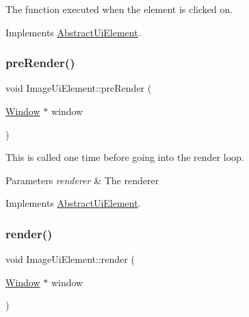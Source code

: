 The function executed when the element is clicked on. 



Implements \mbox{\hyperlink{class_abstract_ui_element_a42296c15c9e70b6ac7fda0b1862612af}{Abstract\+Ui\+Element}}.

\mbox{\label{class_image_ui_element_a15c523c82400b74f2f5713c6510f8c7a}} 
\subsubsection{\texorpdfstring{pre\+Render()}{preRender()}}
{\footnotesize\ttfamily void Image\+Ui\+Element\+::pre\+Render (\begin{DoxyParamCaption}\item[{\mbox{\hyperlink{class_window}{Window}} $\ast$}]{window }\end{DoxyParamCaption})\hspace{0.3cm}{\ttfamily [virtual]}}

This is called one time before going into the render loop. 


\begin{DoxyParams}{Parameters}
{\em renderer} & The renderer\\
\hline
\end{DoxyParams}


Implements \mbox{\hyperlink{class_abstract_ui_element_a859f627ab385e9d3bf6ce8db40607cdb}{Abstract\+Ui\+Element}}.

\mbox{\label{class_image_ui_element_af0928d725565618d6a9c8a2f557c1709}} 
\subsubsection{\texorpdfstring{render()}{render()}}
{\footnotesize\ttfamily void Image\+Ui\+Element\+::render (\begin{DoxyParamCaption}\item[{\mbox{\hyperlink{class_window}{Window}} $\ast$}]{window }\end{DoxyParamCaption})\hspace{0.3cm}{\ttfamily [virtual]}}



